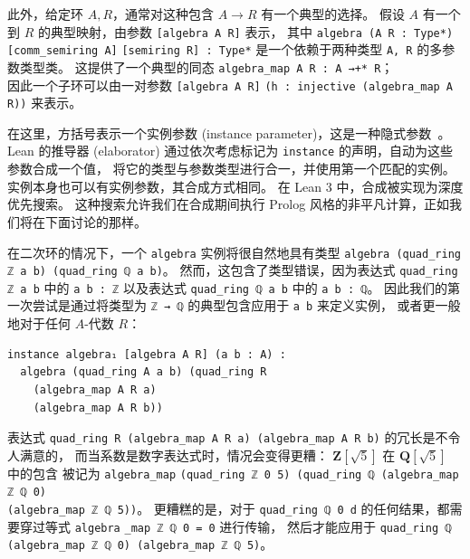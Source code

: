 \documentclass[sigplan,10pt,nonacm,
screen]{acmart} \settopmatter{printfolios=true,printccs=false,printacmref=false}
\newcommand{\QQ}{\mathbf{Q}}
\newcommand{\ZZ}{\mathbf{Z}}
\begin{document}
此外，给定环 $A, R$，通常对这种包含 $A \to R$ 有一个典型的选择。
假设 $A$ 有一个到 $R$ 的典型映射，由参数 \lstinline{[algebra A R]} 表示，
其中 \lstinline{algebra (A R : Type*) [comm_semiring A]} %
\lstinline{[semiring R] : Type*} 是一个依赖于两种类型 \lstinline{A, R} 的多参数类型类。
这提供了一个典型的同态 \lstinline{algebra_map A R : A →+* R}；\\ %
因此一个子环可以由一对参数 \lstinline{[algebra A R]} \lstinline{(h : injective (algebra_map A R))} 来表示。 %

在这里，方括号表示一个实例参数 (instance parameter)，这是一种隐式参数~\cite{typeclasses}。
Lean 的推导器 (elaborator) 通过依次考虑标记为 \lstinline{instance} 的声明，自动为这些参数合成一个值，
将它的类型与参数类型进行合一，并使用第一个匹配的实例。
实例本身也可以有实例参数，其合成方式相同。
在 Lean 3 中，合成被实现为深度优先搜索。
这种搜索允许我们在合成期间执行 Prolog 风格的非平凡计算，正如我们将在下面讨论的那样。

在二次环的情况下，一个 \lstinline{algebra} 实例将很自然地具有类型 \lstinline{algebra (quad_ring ℤ a b) (quad}\-\lstinline{_ring ℚ a b)}。 %
然而，这包含了类型错误，因为表达式 \lstinline{quad_ring ℤ a b} 中的 \lstinline{a b : ℤ} 以及表达式 \lstinline{quad_ring ℚ a b} 中的 \lstinline{a b : ℚ}。
因此我们的第一次尝试是通过将类型为 \lstinline{ℤ → ℚ} 的典型包含应用于 \lstinline{a b} 来定义实例，
或者更一般地对于任何 $A$-代数 $R$：
\begin{lstlisting}
instance algebra₁ [algebra A R] (a b : A) :
  algebra (quad_ring A a b) (quad_ring R
    (algebra_map A R a)
    (algebra_map A R b))
\end{lstlisting}
表达式 \lstinline{quad_ring R (algebra_map A R a) (algebra_map A R b)} 的冗长是不令人满意的，
而当系数是数字表达式时，情况会变得更糟：
$\ZZ[\sqrt{5}]$ 在 $\QQ[\sqrt{5}]$ 中的包含
被记为 \lstinline{algebra_map} \lstinline{(quad_ring ℤ 0 5) (quad_ring ℚ (algebra_map ℤ ℚ 0)}\\ \lstinline{(algebra_map ℤ ℚ 5))}。
更糟糕的是，对于 \lstinline{quad}\-\lstinline{_ring ℚ 0 d} 的任何结果，都需要穿过等式 \lstinline{algebra}\-%
\lstinline{_map ℤ ℚ 0 = 0} 进行传输，
然后才能应用于 \lstinline{quad_ring ℚ} \lstinline{(algebra_}\-\lstinline{map ℤ ℚ 0) (algebra_map ℤ ℚ 5)}。
\end{document}
